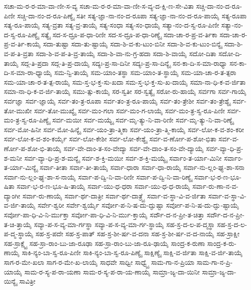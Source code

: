 {ಸಚಾ-ಮ-ರ-ರ-ಮಾ-ವಾ-ಣೀ-ಸ-ವ್ಯ
ಸಚಾ-ಮ-ರ-ರ-ಮಾ-ವಾ-ಣೀ-ಸ-ವ್ಯ-ದ-ಕ್ಷಿ-ಣ-ಸೇ-ವಿತಾ
ಸಚ್ಚಿ-ದಾ-ನಂ-ದ-ರೂ-ಪಿಣೀ
ಸಚ್ಚಿ-ದಾ-ನಂ-ದ-ರೂ-ಪಿಣ್ಯೈ
ಸತೀ
ಸತ್ಯ-ಜ್ಞಾ-ನಾ-ನಂ-ದ-ರೂಪಾ
ಸತ್ಯ-ಜ್ಞಾ-ನಾ-ನಂ-ದ-ರೂ-ಪಾಯೈ
ಸತ್ಯ-ರೂಪಾ
ಸತ್ಯ-ರೂ-ಪಾಯೈ
ಸತ್ಯ-ವ್ರತಾ
ಸತ್ಯ-ವ್ರ-ತಾಯೈ
ಸತ್ಯ-ಸಂಧಾ
ಸತ್ಯ-ಸಂ-ಧಾಯೈ
ಸತ್ಯಾ-ನಂ-ದ-ಸ್ವ-ರೂ-ಪಿಣೀ
ಸತ್ಯಾ-ನಂ-ದ-ಸ್ವ-ರೂ-ಪಿಣ್ಯೈ
ಸತ್ಯೈ
ಸದ-ಸ-ದ್ರೂ-ಪ-ಧಾ-ರಿಣೀ
ಸದ-ಸ-ದ್ರೂ-ಪ-ಧಾ-ರಿಣ್ಯೈ
ಸದಾ-ಚಾ-ರ-ಪ್ರ-ವ-ರ್ತಿಕಾ
ಸದಾ-ಚಾ-ರ-ಪ್ರ-ವ-ರ್ತಿ-ಕಾಯೈ
ಸದಾ-ತುಷ್ಟಾ
ಸದಾ-ತು-ಷ್ಟಾಯೈ
ಸದಾ-ಶಿ-ವ-ಕು-ಟುಂ-ಬಿನೀ
ಸದಾ-ಶಿ-ವ-ಕು-ಟುಂ-ಬಿನ್ಯೈ
ಸದಾ-ಶಿ-ವ-ಪ-ತಿ-ವ್ರತಾ
ಸದಾ-ಶಿ-ವ-ಪ-ತಿ-ವ್ರ-ತಾಯೈ
ಸದಾ-ಶಿ-ವಾ-ನು-ಗ್ರ-ಹದಾ
ಸದಾ-ಶಿ-ವಾಯೈ
ಸದೋ-ದಿತಾ
ಸದೋ-ದಿ-ತಾಯೈ
ಸದ್ಗ-ತಿ-ಪ್ರದಾ
ಸದ್ಗ-ತಿ-ಪ್ರ-ದಾಯೈ
ಸದ್ಯಃ-ಪ್ರ-ಸಾ-ದಿನೀ
ಸದ್ಯಃ-ಪ್ರ-ಸಾ-ದಿನ್ಯೈ
ಸನ-ಕಾ-ದಿ-ಸ-ಮಾ-ರಾಧ್ಯಾ
ಸನ-ಕಾ-ದಿ-ಸ-ಮಾ-ರಾ-ಧ್ಯಾಯೈ
ಸಮ-ನ್ವಿ-ತಾಯೈ
ಸಮ-ಯಾಂ-ತಸ್ಥಾ
ಸಮ-ಯಾಂ-ತ-ಸ್ಥಾಯೈ
ಸಮ-ಯಾ-ಚಾ-ರ-ತ-ತ್ಪರಾ
ಸಮ-ಯಾ-ಚಾ-ರ-ತ-ತ್ಪ-ರಾಯೈ
ಸಮ-ಸ್ತ-ಭ-ಕ್ತ-ಸು-ಖದಾ
ಸಮ-ಸ್ತ-ಭ-ಕ್ತ-ಸು-ಖ-ದಾಯೈ
ಸಮಾ-ನಾ-ಧಿ-ಕ-ವ-ರ್ಜಿತಾ
ಸಮಾ-ನಾ-ಧಿ-ಕ-ವ-ರ್ಜಿ-ತಾಯೈ
ಸಮು-ತ್ಸು-ಕಾಯೈ
ಸರ-ಸ್ವತೀ
ಸರ-ಸ್ವತ್ಯೈ
ಸರೋ-ರು-ಹಾಯೈ
ಸರ್ವಗಾ
ಸರ್ವ-ಗಾಯೈ
ಸರ್ವಜ್ಞಾ
ಸರ್ವ-ಜ್ಞಾಯೈ
ಸರ್ವ-ತಂ-ತ್ರ-ರೂಪಾ
ಸರ್ವ-ತಂ-ತ್ರ-ರೂ-ಪಾಯೈ
ಸರ್ವ-ತಂ-ತ್ರೇಶೀ
ಸರ್ವ-ತಂ-ತ್ರೇಶ್ಯೈ
ಸರ್ವ-ತೋ-ಮುಖೀ
ಸರ್ವ-ತೋ-ಮುಖ್ಯೈ
ಸರ್ವ-ಮಂ-ಗಲಾ
ಸರ್ವ-ಮಂ-ಗ-ಲಾಯೈ
ಸರ್ವ-ಮಂ-ತ್ರ-ಸ್ವ-ರೂ-ಪಿಣೀ
ಸರ್ವ-ಮಂ-ತ್ರ-ಸ್ವ-ರೂ-ಪಿಣ್ಯೈ
ಸರ್ವ-ಮಯೀ
ಸರ್ವ-ಮಯ್ಯೈ
ಸರ್ವ-ಮೃ-ತ್ಯು-ನಿ-ವಾ-ರಿಣೀ
ಸರ್ವ-ಮೃ-ತ್ಯು-ನಿ-ವಾ-ರಿಣ್ಯೈ
ಸರ್ವ-ಮೋ-ಹಿನೀ
ಸರ್ವ-ಮೋ-ಹಿನ್ಯೈ
ಸರ್ವ-ಯಂ-ತ್ರಾ-ತ್ಮಿಕಾ
ಸರ್ವ-ಯಂ-ತ್ರಾ-ತ್ಮಿ-ಕಾಯೈ
ಸರ್ವ-ಲೋ-ಕ-ವ-ಶಂ-ಕರೀ
ಸರ್ವ-ಲೋ-ಕ-ವ-ಶಂ-ಕರ್ಯೈ
ಸರ್ವ-ಲೋ-ಕೇಶೀ
ಸರ್ವ-ಲೋ-ಕೇಶ್ಯೈ
ಸರ್ವ-ವ-ರ್ಣೋ-ಪ-ಶೋ-ಭಿತಾ
ಸರ್ವ-ವ-ರ್ಣೋ-ಪ-ಶೋ-ಭಿ-ತಾಯೈ
ಸರ್ವ-ವೇ-ದಾಂ-ತ-ಸಂ-ವೇದ್ಯಾ
ಸರ್ವ-ವೇ-ದಾಂ-ತ-ಸಂ-ವೇ-ದ್ಯಾಯೈ
ಸರ್ವ-ವ್ಯಾ-ಧಿ-ಪ್ರ-ಶ-ಮನೀ
ಸರ್ವ-ವ್ಯಾ-ಧಿ-ಪ್ರ-ಶ-ಮನ್ಯೈ
ಸರ್ವ-ಶ-ಕ್ತಿ-ಮಯೀ
ಸರ್ವ-ಶ-ಕ್ತಿ-ಮಯ್ಯೈ
ಸರ್ವಾಂ-ತ-ರ್ಯಾ-ಮಿನೀ
ಸರ್ವಾಂ-ತ-ರ್ಯಾ-ಮಿನ್ಯೈ
ಸರ್ವಾ-ತೀತಾ
ಸರ್ವಾ-ತೀ-ತಾಯೈ
ಸರ್ವಾ-ಧಾರಾ
ಸರ್ವಾ-ಧಾ-ರಾಯೈ
ಸರ್ವಾ-ನು-ಲ್ಲಂ-ಘ್ಯ-ಶಾ-ಸನಾ
ಸರ್ವಾ-ನು-ಲ್ಲಂ-ಘ್ಯ-ಶಾ-ಸ-ನಾಯೈ
ಸರ್ವಾ-ಪ-ದ್ವಿ-ನಿ-ವಾ-ರಿಣೀ
ಸರ್ವಾ-ಪ-ದ್ವಿ-ನಿ-ವಾ-ರಿಣ್ಯೈ
ಸರ್ವಾ-ಭ-ರ-ಣ-ಭೂ-ಷಿತಾ
ಸರ್ವಾ-ಭ-ರ-ಣ-ಭೂ-ಷಿ-ತಾಯೈ
ಸರ್ವಾ-ಯು-ಧ-ಧರಾ
ಸರ್ವಾ-ಯು-ಧ-ಧ-ರಾಯೈ
ಸರ್ವಾ-ರು-ಣಾ-ನ-ವ-ದ್ಯಾಂಗೀ
ಸರ್ವಾ-ರು-ಣಾಯೈ
ಸರ್ವಾ-ರ್ಥ-ದಾತ್ರೀ
ಸರ್ವಾ-ರ್ಥ-ದಾತ್ರ್ಯೈ
ಸರ್ವಾ-ವ-ಸ್ಥಾ-ವಿ-ವ-ರ್ಜಿತಾ
ಸರ್ವಾ-ವ-ಸ್ಥಾ-ವಿ-ವ-ರ್ಜಿ-ತಾಯೈ
ಸರ್ವೇ-ಶ್ವರೀ
ಸರ್ವೇ-ಶ್ವರ್ಯೈ
ಸರ್ವೋ-ಪ-ನಿ-ಷ-ದು-ದ್ಘುಷ್ಟಾ
ಸರ್ವೋ-ಪ-ನಿ-ಷ-ದು-ದ್ಘು-ಷ್ಟಾಯೈ
ಸರ್ವೋ-ಪಾ-ಧಿ-ವಿ-ನಿ-ರ್ಮುಕ್ತಾ
ಸರ್ವೋ-ಪಾ-ಧಿ-ವಿ-ನಿ-ರ್ಮು-ಕ್ತಾಯೈ
ಸರ್ವೌ-ದ-ನ-ಪ್ರೀ-ತ-ಚಿತ್ತಾ
ಸರ್ವೌ-ದ-ನ-ಪ್ರೀ-ತ-ಚಿ-ತ್ತಾಯೈ
ಸವ್ಯಾ-ಪ-ಸ-ವ್ಯ-ಮಾ-ರ್ಗಸ್ಥಾ
ಸವ್ಯಾ-ಪ-ಸ-ವ್ಯ-ಮಾ-ರ್ಗ-ಸ್ಥಾಯೈ
ಸಹ-ಸ್ರ-ದ-ಲ-ಪ-ದ್ಮಸ್ಥಾ
ಸಹ-ಸ್ರ-ದ-ಲ-ಪ-ದ್ಮ-ಸ್ಥಾಯೈ
ಸಹ-ಸ್ರ-ಪದೇ
ಸಹ-ಸ್ರ-ಪಾತ್
ಸಹ-ಸ್ರ-ಶೀ-ರ್ಷ-ವ-ದನಾ
ಸಹ-ಸ್ರ-ಶೀ-ರ್ಷ-ವ-ದ-ನಾಯೈ
ಸಹ-ಸ್ರಾಕ್ಷೀ
ಸಹ-ಸ್ರಾಕ್ಷ್ಯೈ
ಸಹ-ಸ್ರಾ-ರಾಂ-ಬು-ಜಾ-ರೂಢಾ
ಸಹ-ಸ್ರಾ-ರಾಂ-ಬು-ಜಾ-ರೂ-ಢಾಯೈ
ಸಾಂದ್ರ-ಕ-ರುಣಾ
ಸಾಂದ್ರ-ಕ-ರು-ಣಾಯೈ
ಸಾಕಿ-ನ್ಯಂ-ಬಾ-ಸ್ವ-ರೂ-ಪಿಣೀ
ಸಾಕಿ-ನ್ಯಂ-ಬಾ-ಸ್ವ-ರೂ-ಪಿಣ್ಯೈ
ಸಾಕ್ಷಿಣ್ಯೈ
ಸಾಕ್ಷಿ-ವ-ರ್ಜಿತಾ
ಸಾಕ್ಷಿ-ವ-ರ್ಜಿ-ತಾಯೈ
ಸಾಗ-ರ-ಮೇ-ಖಲಾ
ಸಾಗ-ರ-ಮೇ-ಖ-ಲಾಯೈ
ಸಾಧವೇ
ಸಾಧ್ವೀ
ಸಾಧ್ವ್ಯೈ
ಸಾಮ-ಗಾ-ನ-ಪ್ರಿಯಾ
ಸಾಮ-ಗಾ-ನ-ಪ್ರಿ-ಯಾಯೈ
ಸಾಮ-ರ-ಸ್ಯ-ಪ-ರಾ-ಯಣಾ
ಸಾಮ-ರ-ಸ್ಯ-ಪ-ರಾ-ಯ-ಣಾಯೈ
ಸಾಮ್ರಾ-ಜ್ಯ-ದಾ-ಯಿನೀ
ಸಾಮ್ರಾ-ಜ್ಯ-ದಾ-ಯಿನ್ಯೈ
ಸಾವಿತ್ರೀ
}
